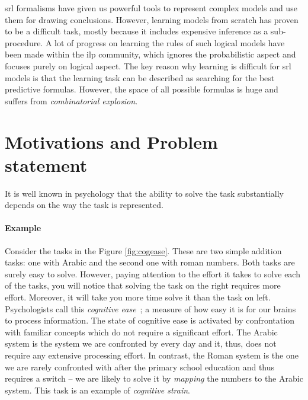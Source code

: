 \gls{srl} formalisms have given us powerful tools to represent complex models and use them for drawing conclusions.
However, learning models from scratch has proven to be a difficult task, mostly because it includes expensive inference as a sub-procedure.
A lot of progress on learning the rules of such logical models have been made within the \gls{ilp} community, which ignores the probabilistic aspect and focuses purely on logical aspect.
The key reason why learning is difficult for \gls{srl} models is that the learning task can be described as searching for the best predictive formulas.
However, the space of all possible formulas is huge and suffers from \textit{combinatorial explosion}.










\section{Motivations and Problem statement}

It is well known in psychology that the ability to solve the task substantially depends on the way the task is represented.




\paragraph{Example} Consider the tasks in the Figure \ref{fig:cogease}.
These are two simple addition tasks: one with Arabic and the second one with roman numbers.
Both tasks are surely easy to solve.
However, paying attention to the effort it takes to solve each of the tasks, you will notice that solving the task on the right requires more effort.
Moreover, it will take you more time solve it than the task on left.
Psychologists call this \textit{cognitive ease}~\cite{kahneman2011thinking}; a measure of how easy it is for our brains to process information.
The state of cognitive ease is activated by confrontation with familiar concepts which do not require a significant effort.
The Arabic system is the system we are confronted by every day and it, thus, does not require any extensive processing effort.
In contrast, the Roman system is the one we are rarely confronted with after the primary school education and thus requires a switch -- we are likely to solve it by \textit{mapping} the numbers to the Arabic system.
This task is an example of \textit{cognitive strain}.



